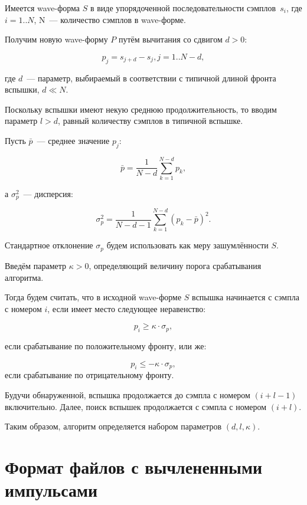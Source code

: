 \documentclass[12pt, a4paper, oneside, onecolumn]{book}
\begin{document}
Имеется wave-форма $S$ в виде упорядоченной последовательности сэмплов~$s_i$, где $i = 1..N$, N~--- количество сэмплов в wave-форме.

Получим новую wave-форму $P$ путём вычитания со сдвигом $d > 0$:

$$
p_j = s_{j+d} - s_j, j = 1..N-d,
$$

\noindent где $d$~--- параметр, выбираемый в соответствии с типичной длиной фронта вспышки, $d \ll N$.

Поскольку вспышки имеют некую среднюю продолжительность, то вводим параметр $l > d$, равный количеству сэмплов в типичной вспышке. 

Пусть $\bar{p}$~--- среднее значение $p_j$:

$$
\bar{p} = \frac{1}{N-d} \sum_{k=1}^{N-d} p_k,
$$

\noindent а $\sigma_p^2$~--- дисперсия:

$$
\sigma_p^2 = \frac{1}{N-d-1} \sum_{k=1}^{N-d} \left( p_k - \bar{p} \right) ^2.
$$

Стандартное отклонение $\sigma_p$ будем использовать как меру зашумлённости $S$.

Введём параметр $\kappa > 0$, определяющий величину порога срабатывания алгоритма.

Тогда будем считать, что в исходной wave-форме $S$ вспышка начинается с сэмпла с номером $i$, если имеет место следующее неравенство:

\begin{equation}
p_i \ge \kappa \cdot \sigma_p,
\end{equation}

\noindent если срабатывание по положительному фронту, или же:

\begin{equation}
p_i \le -\kappa \cdot \sigma_p,
\end{equation}
\noindent если срабатывание по отрицательному фронту.

Будучи обнаруженной, вспышка продолжается до сэмпла с номером $(i + l - 1)$ включительно. Далее, поиск вспышек продолжается с сэмпла с номером $(i + l)$.

Таким образом, алгоритм определяется набором параметров $(d, l, \kappa)$.


\chapter{Формат файлов с вычлененными импульсами}
\label{sec_peaks_file_format}
\end{document}
